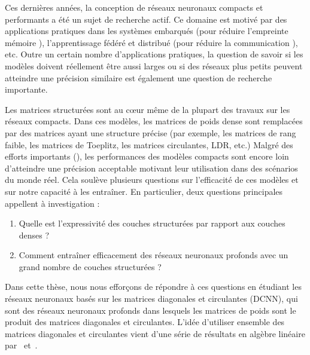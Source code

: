 %


Ces dernières années, la conception de réseaux neuronaux compacts et performants a été un sujet de recherche actif.
Ce domaine est motivé par des applications pratiques dans les systèmes embarqués (pour réduire l'empreinte mémoire \cite{sainath2015convolutional}), l'apprentissage fédéré et distribué (pour réduire la communication \cite{konecny2016federated}), etc.
Outre un certain nombre d'applications pratiques, la question de savoir si les modèles doivent réellement être aussi larges ou si des réseaux plus petits peuvent atteindre une précision similaire est également une question de recherche importante.

Les matrices structurées sont au cœur même de la plupart des travaux sur les réseaux compacts.
Dans ces modèles, les matrices de poids dense sont remplacées par des matrices ayant une structure précise (par exemple, les matrices de rang faible, les matrices de Toeplitz, les matrices circulantes, LDR, etc.)
Malgré des efforts importants (\citet{cheng2015exploration,moczulski2016acdc}), les performances des modèles compacts sont encore loin d'atteindre une précision acceptable motivant leur utilisation dans des scénarios du monde réel.
Cela soulève plusieurs questions sur l'efficacité de ces modèles et sur notre capacité à les entraîner.
En particulier, deux questions principales appellent à investigation :
\begin{enumerate}[leftmargin=0.5cm]
  \item Quelle est l'expressivité des couches structurées par rapport aux couches denses ?
  \item Comment entraîner efficacement des réseaux neuronaux profonds avec un grand nombre de couches structurées ?
\end{enumerate}
Dans cette thèse, nous nous efforçons de répondre à ces questions en étudiant les réseaux neuronaux basés sur les matrices diagonales et circulantes (\aka DCNN), qui sont des réseaux neuronaux profonds dans lesquels les matrices de poids sont le produit des matrices diagonales et circulantes.
L'idée d'utiliser ensemble des matrices diagonales et circulantes vient d'une série de résultats en algèbre linéaire par~\citet{muller1998algorithmic} et~\citet{huhtanen2015factoring}.

